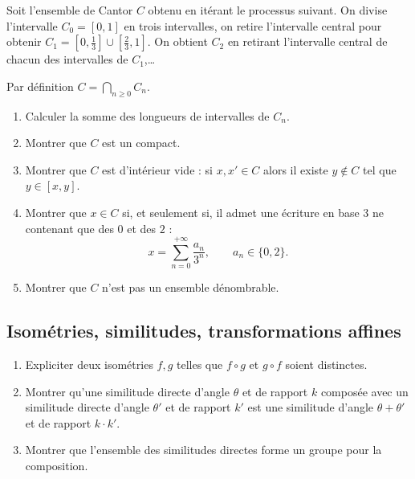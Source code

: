\documentclass[11pt,class=report,crop=false]{standalone}
\newcommand{\commentfigure}[1]{#1} %
\begin{document}
\begin{exercicecours}


Soit l'ensemble de Cantor $C$ obtenu en itérant le processus suivant.
On divise l'intervalle $C_0 = [0,1]$ en trois intervalles, on retire l'intervalle central pour obtenir 
$C_1=[0,\frac13] \cup [\frac 23,1]$. On obtient $C_2$ en retirant l'intervalle central de chacun des intervalles de $C_1$,\ldots

Par définition $C = \bigcap_{n\ge0} C_n$.
\begin{enumerate}
  \item Calculer la somme des longueurs de intervalles de $C_n$.
  \item Montrer que $C$ est un compact.
  \item Montrer que $C$ est d'intérieur vide : si $x,x' \in C$ alors il existe $y\notin C$ tel que $y \in [x,y]$.
  \item Montrer que $x\in C$ si, et seulement si, il admet une écriture en base $3$ ne contenant que des $0$ et des $2$ :
$$x = \sum_{n=0}^{+\infty} \frac{a_n}{3^n},\qquad a_n\in \{0,2\}.$$
  \item Montrer que $C$ n'est pas un ensemble dénombrable.
\end{enumerate}

\commentfigure{
}



\end{exercicecours}



\subsection{Isométries, similitudes, transformations affines}


\begin{exercicecours}
\sauteligne
\begin{enumerate}
 \item Expliciter deux isométries $f,g$ telles que $f\circ g$ et $g\circ f$ soient distinctes.
  \item Montrer qu'une similitude directe d'angle $\theta$ et de rapport $k$ composée 
avec un similitude directe d'angle $\theta'$ et de rapport $k'$
est une similitude d'angle $\theta+\theta'$ et de rapport $k\cdot k'$. 
 \item Montrer que l'ensemble des similitudes directes forme un groupe pour la composition.
\end{enumerate}
\end{exercicecours}
\end{document}

